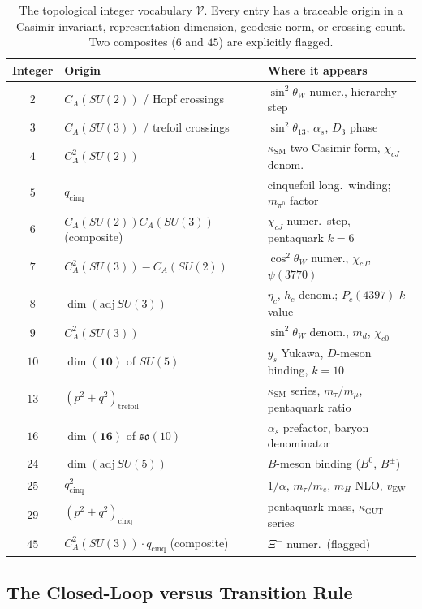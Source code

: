 \documentclass[11pt]{article}
\newcommand{\so}{\mathfrak{so}}
\newcommand{\CA}{C_A}
\newcommand{\ksm}{\kappa_\text{SM}}
\newcommand{\kgut}{\kappa_\text{GUT}}
\begin{document}
\begin{table}[h]
\centering
\begin{tabular}{cll}
\toprule
Integer & Origin & Where it appears \\
\midrule
$2$ & $\CA(SU(2))$ / Hopf crossings & $\sin^2\theta_W$ numer., hierarchy step \\
$3$ & $\CA(SU(3))$ / trefoil crossings & $\sin^2\theta_{13}$, $\alpha_s$, $D_3$ phase \\
$4$ & $\CA^2(SU(2))$ & $\ksm$ two-Casimir form, $\chi_{cJ}$ denom.\ \\
$5$ & $q_\text{cinq}$ & cinquefoil long.\ winding; $m_{\pi^0}$ factor \\
$6$ & $\CA(SU(2))\CA(SU(3))$ (composite) & $\chi_{cJ}$ numer.\ step, pentaquark $k{=}6$ \\
$7$ & $\CA^2(SU(3)) - \CA(SU(2))$ & $\cos^2\theta_W$ numer., $\chi_{cJ}$, $\psi(3770)$ \\
$8$ & $\dim(\mathrm{adj}\,SU(3))$ & $\eta_c$, $h_c$ denom.; $P_c(4397)$ $k$-value \\
$9$ & $\CA^2(SU(3))$ & $\sin^2\theta_W$ denom., $m_d$, $\chi_{c0}$ \\
$10$ & $\dim(\mathbf{10})$ of $SU(5)$ & $y_s$ Yukawa, $D$-meson binding, $k{=}10$ \\
$13$ & $(p^2+q^2)_\text{trefoil}$ & $\ksm$ series, $m_\tau/m_\mu$, pentaquark ratio \\
$16$ & $\dim(\mathbf{16})$ of $\so(10)$ & $\alpha_s$ prefactor, baryon denominator \\
$24$ & $\dim(\mathrm{adj}\,SU(5))$ & $B$-meson binding ($B^0$, $B^\pm$) \\
$25$ & $q^2_\text{cinq}$ & $1/\alpha$, $m_\tau/m_e$, $m_H$ NLO, $v_\text{EW}$ \\
$29$ & $(p^2+q^2)_\text{cinq}$ & pentaquark mass, $\kgut$ series \\
$45$ & $\CA^2(SU(3))\cdot q_\text{cinq}$ (composite) & $\Xi^-$ numer.\ (flagged) \\
\bottomrule
\end{tabular}
\caption{The topological integer vocabulary $\mathcal{V}$.  Every
entry has a traceable origin in a Casimir invariant, representation
dimension, geodesic norm, or crossing count.  Two composites ($6$
and $45$) are explicitly flagged.}
\label{tab:integers}
\end{table}

\subsection{The Closed-Loop versus Transition Rule}
\end{document}
